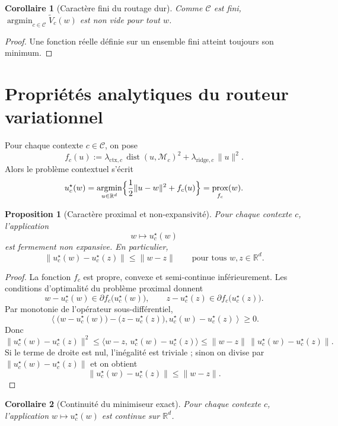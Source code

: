 \documentclass[11pt,a4paper]{article}
\newtheorem{proposition}{Proposition}[section]
\newtheorem{corollary}{Corollaire}[section]
\DeclareMathOperator{\prox}{prox}
\DeclareMathOperator{\argmin}{argmin}
\DeclareMathOperator{\dist}{dist}
\newcommand{\R}{\mathbb R}
\newcommand{\Mcal}{\mathcal M}
\newcommand{\Ccal}{\mathcal C}
\begin{document}
\begin{corollary}[Caractère fini du routage dur]
Comme \(\Ccal\) est fini, \(\argmin_{c\in\Ccal}\widetilde V_c(w)\) est non vide pour tout \(w\).
\end{corollary}

\begin{proof}
Une fonction réelle définie sur un ensemble fini atteint toujours son minimum.
\end{proof}




\section{Propriétés analytiques du routeur variationnel}

Pour chaque contexte \(c\in\Ccal\), on pose
\[
f_c(u):=\lambda_{\mathrm{ctx},c}\,\dist(u,\Mcal_c)^2+\lambda_{\mathrm{ridge},c}\,\|u\|^2.
\]
Alors le problème contextuel s'écrit
\[
u_c^\star(w)=\argmin_{u\in\R^d}\Bigl\{\frac12\|u-w\|^2+f_c(u)\Bigr\}
=\prox_{f_c}(w).
\]

\begin{proposition}[Caractère proximal et non-expansivité]
Pour chaque contexte \(c\), l'application
\[
w\longmapsto u_c^\star(w)
\]
est fermement non expansive. En particulier,
\[
\|u_c^\star(w)-u_c^\star(z)\|\le \|w-z\|
\qquad
\text{pour tous } w,z\in\R^d.
\]
\end{proposition}

\begin{proof}
La fonction \(f_c\) est propre, convexe et semi-continue inférieurement. Les conditions d'optimalité du problème proximal donnent
\[
w-u_c^\star(w)\in \partial f_c\bigl(u_c^\star(w)\bigr),
\qquad
z-u_c^\star(z)\in \partial f_c\bigl(u_c^\star(z)\bigr).
\]
Par monotonie de l'opérateur sous-différentiel,
\[
\left\langle
\bigl(w-u_c^\star(w)\bigr)-\bigl(z-u_c^\star(z)\bigr),
u_c^\star(w)-u_c^\star(z)
\right\rangle\ge 0.
\]
Donc
\[
\|u_c^\star(w)-u_c^\star(z)\|^2
\le
\langle w-z,\,u_c^\star(w)-u_c^\star(z)\rangle
\le
\|w-z\|\,\|u_c^\star(w)-u_c^\star(z)\|.
\]
Si le terme de droite est nul, l'inégalité est triviale ; sinon on divise par
\(\|u_c^\star(w)-u_c^\star(z)\|\) et on obtient
\[
\|u_c^\star(w)-u_c^\star(z)\|\le \|w-z\|.
\]
\end{proof}

\begin{corollary}[Continuité du minimiseur exact]
Pour chaque contexte \(c\), l'application \(w\mapsto u_c^\star(w)\) est continue sur \(\R^d\).
\end{corollary}
\end{document}
